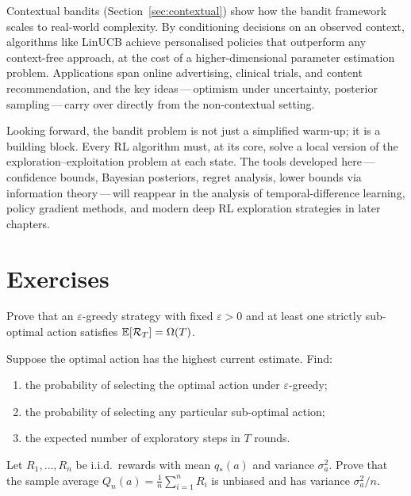 Contextual bandits (Section~\ref{sec:contextual}) show how the bandit framework scales to real-world complexity.  By conditioning decisions on an observed context, algorithms like LinUCB achieve personalised policies that outperform any context-free approach, at the cost of a higher-dimensional parameter estimation problem.  Applications span online advertising, clinical trials, and content recommendation, and the key ideas\,---\,optimism under uncertainty, posterior sampling\,---\,carry over directly from the non-contextual setting.

Looking forward, the bandit problem is not just a simplified warm-up; it is a building block.  Every RL algorithm must, at its core, solve a local version of the exploration--exploitation problem at each state.  The tools developed here\,---\,confidence bounds, Bayesian posteriors, regret analysis, lower bounds via information theory\,---\,will reappear in the analysis of temporal-difference learning, policy gradient methods, and modern deep RL exploration strategies in later chapters.


\section*{Exercises}

\begin{exercise}
Prove that an $\varepsilon$-greedy strategy with fixed $\varepsilon>0$ and at least one strictly sub-optimal action satisfies $\operatorname{\mathbb{E}}[\mathcal{R}_T]=\Omega(T)$.
\end{exercise}

\begin{exercise}
Suppose the optimal action has the highest current estimate.  Find:
\begin{enumerate}[label=(\alph*)]
\item the probability of selecting the optimal action under $\varepsilon$-greedy;
\item the probability of selecting any particular sub-optimal action;
\item the expected number of exploratory steps in $T$ rounds.
\end{enumerate}
\end{exercise}

\begin{exercise}
Let $R_1,\dots,R_n$ be i.i.d.\ rewards with mean $q_*(a)$ and variance $\sigma_a^2$.  Prove that the sample average $Q_n(a)=\frac{1}{n}\sum_{i=1}^{n}R_i$ is unbiased and has variance $\sigma_a^2/n$.
\end{exercise}

